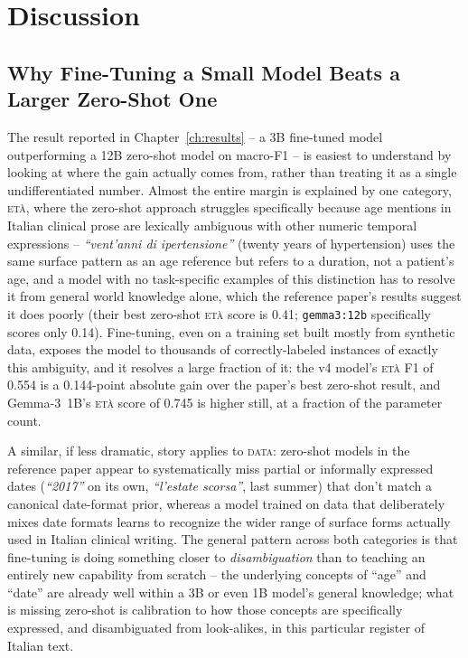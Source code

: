 \documentclass[12pt,a4paper]{report}
\newcommand{\ETA}{\textsc{et\`a}}
\newcommand{\DATA}{\textsc{data}}
\begin{document}
\chapter{Discussion}
\label{ch:discussion}

\section{Why Fine-Tuning a Small Model Beats a Larger Zero-Shot One}

The result reported in Chapter~\ref{ch:results} -- a 3B fine-tuned model outperforming a 12B zero-shot model on macro-F1 -- is easiest to understand by looking at where the gain actually comes from, rather than treating it as a single undifferentiated number. Almost the entire margin is explained by one category, \ETA{}, where the zero-shot approach struggles specifically because age mentions in Italian clinical prose are lexically ambiguous with other numeric temporal expressions -- \emph{``vent'anni di ipertensione''} (twenty years of hypertension) uses the same surface pattern as an age reference but refers to a duration, not a patient's age, and a model with no task-specific examples of this distinction has to resolve it from general world knowledge alone, which the reference paper's results suggest it does poorly (their best zero-shot \ETA{} score is 0.41; \texttt{gemma3:12b} specifically scores only 0.14). Fine-tuning, even on a training set built mostly from synthetic data, exposes the model to thousands of correctly-labeled instances of exactly this ambiguity, and it resolves a large fraction of it: the v4 model's \ETA{} F1 of 0.554 is a 0.144-point absolute gain over the paper's best zero-shot result, and Gemma-3~1B's \ETA{} score of 0.745 is higher still, at a fraction of the parameter count.

A similar, if less dramatic, story applies to \DATA{}: zero-shot models in the reference paper appear to systematically miss partial or informally expressed dates (\emph{``2017''} on its own, \emph{``l'estate scorsa''}, last summer) that don't match a canonical date-format prior, whereas a model trained on data that deliberately mixes date formats learns to recognize the wider range of surface forms actually used in Italian clinical writing. The general pattern across both categories is that fine-tuning is doing something closer to \emph{disambiguation} than to teaching an entirely new capability from scratch -- the underlying concepts of ``age'' and ``date'' are already well within a 3B or even 1B model's general knowledge; what is missing zero-shot is calibration to how those concepts are specifically expressed, and disambiguated from look-alikes, in this particular register of Italian text.
\end{document}
